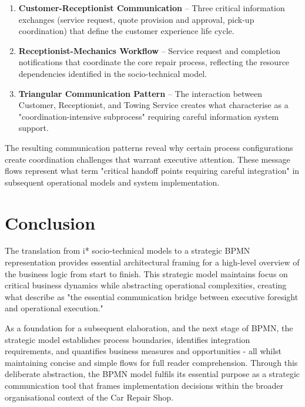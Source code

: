 \documentclass[14pt,a4paper]{article}
\begin{document}
\begin{enumerate}
    \item \textbf{Customer-Receptionist Communication} – Three critical information exchanges (service request, quote provision and approval, pick-up coordination) that define the customer experience life cycle.

    \item \textbf{Receptionist-Mechanics Workflow} – Service request and completion notifications that coordinate the core repair process, reflecting the resource dependencies identified in the socio-technical model.

    \item \textbf{Triangular Communication Pattern} – The interaction between Customer, Receptionist, and Towing Service creates what \textcite{Corradini2018} characterise as a "coordination-intensive subprocess" requiring careful information system support.
\end{enumerate}

The resulting communication patterns reveal why certain process configurations create coordination challenges that warrant executive attention. These message flows represent what \textcite[p. 195]{Delgado2020} term "critical handoff points requiring careful integration" in subsequent operational models and system implementation.

\section{Conclusion}

The translation from i* socio-technical models to a strategic BPMN representation provides essential architectural framing for a high-level overview of the business logic from start to finish. This strategic model maintains focus on critical business dynamics while abstracting operational complexities, creating what \textcite[p. 103]{Bosch2018} describe as "the essential communication bridge between executive foresight and operational execution."

As a foundation for a subsequent elaboration, and the next stage of BPMN, the strategic model establishes process boundaries, identifies integration requirements, and quantifies business measures and opportunities - all whilst maintaining concise and simple flows for full reader comprehension. Through this deliberate abstraction, the BPMN model fulfils its essential purpose as a strategic communication tool that frames implementation decisions within the broader organisational context of the Car Repair Shop.

\newpage

\printbibliography
\end{document}
